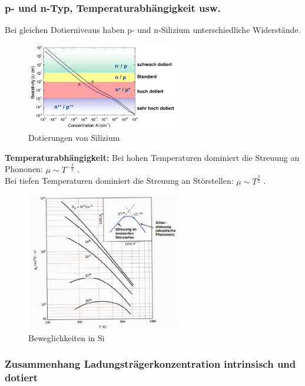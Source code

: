 	\subsubsection{p- und n-Typ, Temperaturabhängigkeit usw.}
		Bei gleichen Dotierniveaus haben p- und n-Silizium unterschiedliche Widerstände.
		
		\begin{figure}[h!]
			\centering
			\includegraphics[width=0.6\textwidth]{Kapitel/Kap04/dotierungSi.png}
			\caption{Dotierungen von Silizium}
			\label{04_dotSi}
		\end{figure}
		
		\textbf{Temperaturabhängigkeit:}
		Bei hohen Temperaturen dominiert die Streuung an Phononen: $\mu \sim T^{-\frac{3}{2}}$ .\\
		Bei tiefen Temperaturen dominiert die Streuung an Störstellen: $\mu \sim T^{\frac{3}{2}}$ .\\
		\begin{figure}[h!]
			\centering
			\includegraphics[width=0.6\textwidth]{Kapitel/Kap04/beweglInSi.png}
			\caption{Beweglichkeiten in Si}
			\label{04_beweglInSi}
		\end{figure}
		
	\subsubsection{Zusammenhang Ladungsträgerkonzentration intrinsisch und dotiert}
		
